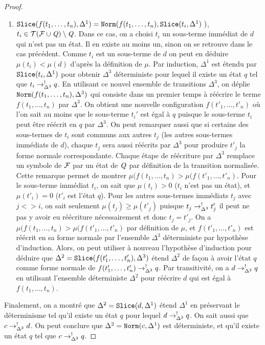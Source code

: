 \begin{proof}
\begin{enumerate}
   \item $\mathtt{Slice}(f(t_1, \dots, t_n), \Delta^1) = \mathtt{Norm}(f(t_1,\dots, t_n), \mathtt{Slice}(t_i, \Delta^1)\ )$, $t_i \in \mathcal{ T(F \cup \mathit Q)} \setminus \mathit Q$.
     Dans ce cas, on a choisi $t_i$ un sous-terme immédiat de $d$ qui n'est pas un état. Il en existe au moins un, sinon on se retrouve dans le cas précédent.
     Comme $t_i$ est un sous-terme de $d$ on peut en déduire $\mu(t_i) < \mu(d)$ d'après la définition de $\mu$.
     Par induction, $\Delta^1$ est étendu par $\mathtt{Slice}(t_i, \Delta^1)$ pour obtenir $\Delta^3$ déterministe pour lequel il existe un état $q$ 
     tel que $t_i \rightarrow^!_{\Delta^3} q$. En utilisant ce nouvel ensemble de transitions $\Delta^3$, on déplie $\mathtt{Norm}(f(t_1,\dots, t_n), \Delta^3)$ 
     qui consiste dans un premier temps à réécrire le terme $f(t_1, \dots, t_n)$ par $\Delta^3$. On obtient une nouvelle configuration $f(t'_1, \dots, t'_n)$ où l'on sait
     au moins que le sous-terme $t_i'$ est égal à $q$ puisque le sous-terme $t_i$ peut être réécrit en $q$ par $\Delta^3$. On peut remarquer aussi
     que si certains des sous-termes de $t_i$ sont communs aux autres $t_j$ (les autres sous-termes immédiats de $d$), chaque $t_j$ sera aussi réécrits
     par $\Delta^3$ pour produire $t'_j$ la forme normale correspondante.
     Chaque étape de réécriture par $\Delta^3$ remplace un symbole de $\mathcal{F}$ par un état de $\mathit Q$ par définition de la transition normalisée.
     Cette remarque permet de montrer $\mu(f(t_1,\dots,t_n) > \mu(f(t'_1,\dots,t'_n)$.
     Pour le sous-terme immédiat $t_i$, on sait que $\mu(t_i) > 0$ ($t_i$ n'est pas un état), et $\mu(t'_i) = 0$ ($t'_i$ est l'état $q$).
     Pour les autres sous-termes immédiats $t_j$ avec $j <> i$, on sait seulement $\mu(t_j) \ge \mu(t'_j)$ puisque $t_j \rightarrow^!_{\Delta^3} t'_j$ 
     il peut ne pas y avoir eu réécriture nécessairement et donc $t_j = t'_j$.
     On a $\mu(f(t_1,\dots,t_n) > \mu(f(t'_1,\dots,t'_n)$ par définition de $\mu$, et $f(t'_1,\dots,t'_n)$ est réécrit en sa forme normale par 
     l'ensemble $\Delta^3$ déterministe par hypothèse d'induction.
     Alors, on peut utiliser à nouveau l'hypothèse d'induction pour déduire que $\Delta^2 = \mathtt{Slice}(f(t'_1,\dots,t'_n), \Delta^3)$
     étend $\Delta^2$ de façon à avoir l'état $q$ comme forme normale de $f(t'_1,\dots,t'_n) \rightarrow^!_{\Delta^2} q$.
     Par transitivité, on a  $d \rightarrow^!_{\Delta^2} q$ en utilisant l'ensemble déterministe $\Delta^2$ pour réécrire $d$ qui est égal à  $f(t_1, \dots, t_n)$.
   \end{enumerate}

   Finalement, on a montré que $\Delta^2 = \mathtt{Slice}(d, \Delta^1)$ étend $\Delta^1$ en préservant le déterminisme tel qu'il existe un état 
   $q$ pour lequel $d \rightarrow^!_{\Delta^2} q$. On sait aussi que $c \rightarrow^!_{\Delta^2} d$. On peut conclure que $\Delta^2 = \mathtt{Norm}(c, \Delta^1)$
   est déterministe, et qu'il existe un état $q$ tel que $c \rightarrow^!_{\Delta^2} q$.
 \end{proof}

